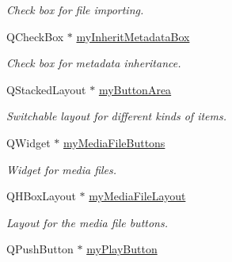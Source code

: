 \begin{DoxyCompactItemize}
\begin{DoxyCompactList}\small\item\em Check box for file importing. \end{DoxyCompactList}\item 
\hypertarget{class_u_i_1_1_info_pane_a9ed159760b4a5f606e73c1f9d8d4ecd4}{Q\-Check\-Box $\ast$ \hyperlink{class_u_i_1_1_info_pane_a9ed159760b4a5f606e73c1f9d8d4ecd4}{my\-Inherit\-Metadata\-Box}}\label{class_u_i_1_1_info_pane_a9ed159760b4a5f606e73c1f9d8d4ecd4}

\begin{DoxyCompactList}\small\item\em Check box for metadata inheritance. \end{DoxyCompactList}\item 
\hypertarget{class_u_i_1_1_info_pane_a43869a41a137fffed84591d88b540127}{Q\-Stacked\-Layout $\ast$ \hyperlink{class_u_i_1_1_info_pane_a43869a41a137fffed84591d88b540127}{my\-Button\-Area}}\label{class_u_i_1_1_info_pane_a43869a41a137fffed84591d88b540127}

\begin{DoxyCompactList}\small\item\em Switchable layout for different kinds of items. \end{DoxyCompactList}\item 
\hypertarget{class_u_i_1_1_info_pane_a2656708687fd6f76bed4ff5be1d9d6f9}{Q\-Widget $\ast$ \hyperlink{class_u_i_1_1_info_pane_a2656708687fd6f76bed4ff5be1d9d6f9}{my\-Media\-File\-Buttons}}\label{class_u_i_1_1_info_pane_a2656708687fd6f76bed4ff5be1d9d6f9}

\begin{DoxyCompactList}\small\item\em Widget for media files. \end{DoxyCompactList}\item 
\hypertarget{class_u_i_1_1_info_pane_afa63c7edafbb5f9d8d7183fddc7e676a}{Q\-H\-Box\-Layout $\ast$ \hyperlink{class_u_i_1_1_info_pane_afa63c7edafbb5f9d8d7183fddc7e676a}{my\-Media\-File\-Layout}}\label{class_u_i_1_1_info_pane_afa63c7edafbb5f9d8d7183fddc7e676a}

\begin{DoxyCompactList}\small\item\em Layout for the media file buttons. \end{DoxyCompactList}\item 
\hypertarget{class_u_i_1_1_info_pane_a06101c747cdc0fdfa2c505be8e93f702}{Q\-Push\-Button $\ast$ \hyperlink{class_u_i_1_1_info_pane_a06101c747cdc0fdfa2c505be8e93f702}{my\-Play\-Button}}\label{class_u_i_1_1_info_pane_a06101c747cdc0fdfa2c505be8e93f702}


\end{DoxyCompactItemize}
